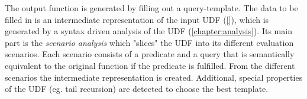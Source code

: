 

The output function is generated by filling out a query-template. The data to be filled in is an intermediate representation of the input UDF (\autoref{}), which is generated by a syntax driven analysis of the UDF (\autoref{chapter:analysis}). Its main part is the \textit{scenario analysis} which "slices" the UDF into its different evaluation scenarios. Each scenario consists of a predicate and a query that is semantically equivalent to the original function if the predicate is fulfilled. From the different scenarios the intermediate representation is created. Additional, special properties of the UDF (eg. tail recursion) are detected to choose the best template.


